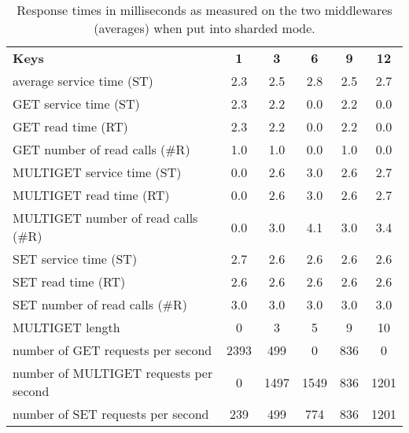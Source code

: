 \documentclass[11pt,a4paper]{article}
\let\tb\textbf
\begin{document}
\begin{table}
\centering
    \scriptsize{
		\begin{tabular}{|l||c|c|c|c|c|} \hline 
		\tb{Keys}  & \tb{1}    &      \tb{3}     &     \tb{6}       &   \tb{9}  &       \tb{12}   \\ \hhline{|=|=|=|=|=|=|}  
        average service time (ST)  &  2.3    &     2.5     &    2.8   &      2.5      &   2.7 \\\Xhline{2\arrayrulewidth}
        GET service time (ST)     &   2.3      &   2.2  &       0.0   &      2.2    &     0.0   \\
        GET read time (RT)   &    2.3      &   2.2      &   0.0     &    2.2     &    0.0  \\
        GET number of read calls (\#R)        &    1.0      &   1.0    &     0.0      &   1.0       &  0.0    \\\Xhline{2\arrayrulewidth}
        MULTIGET service time (ST)    &    0.0    &     2.6 &        3.0   &      2.6    &     2.7   \\
        MULTIGET read time (RT)      &  0.0      &   2.6    &     3.0     &    2.6       &  2.7  \\
        MULTIGET number of read calls (\#R)     &   0.0    &     3.0     &    4.1     &    3.0     &    3.4    \\\Xhline{2\arrayrulewidth}
        SET service time (ST)   &     2.7     &    2.6      &   2.6     &    2.6   &      2.6   \\
        SET read time (RT)     &  2.6      &   2.6     &    2.6     &    2.6     &    2.6   \\
        SET number of read calls (\#R)    &    3.0      &   3.0    &     3.0      &   3.0     &    3.0 \\\Xhline{2\arrayrulewidth}
        MULTIGET length  &            0    &       3    &       5      &     9      &    10 \\\Xhline{2\arrayrulewidth}
        number of GET requests per second   &  2393    &     499   &        0   &      836     &      0 \\
        number of MULTIGET requests per second&  0    &    1497    &    1549   &      836     &   1201  \\
        number of SET requests per second  &   239     &    499     &    774   &      836      &  1201 \\ \hline

		\end{tabular}
	}
    \caption{Response times in milliseconds as measured on the two middlewares (averages) when put into sharded mode.}
    \label{tbl:sharded_mw}
\end{table}
\end{document}
